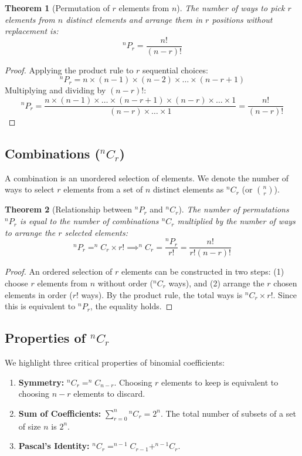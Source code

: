 \documentclass[10pt,journal,compsoc,onecolumn]{IEEEtran}
\newtheorem{theorem}{Theorem}
\begin{document}
\begin{theorem}[Permutation of $r$ elements from $n$]
The number of ways to pick $r$ elements from $n$ distinct elements and arrange them in $r$ positions without replacement is:
\[
^nP_r = \frac{n!}{(n-r)!}
\]
\end{theorem}
\begin{proof}
Applying the product rule to $r$ sequential choices:
\[
^nP_r = n \times (n-1) \times (n-2) \times \dots \times (n-r+1)
\]
Multiplying and dividing by $(n-r)!$:
\[
^nP_r = \frac{n \times (n-1) \times \dots \times (n-r+1) \times (n-r) \times \dots \times 1}{(n-r) \times \dots \times 1} = \frac{n!}{(n-r)!}
\]
\end{proof}

\subsection{Combinations ($^nC_r$)}
A combination is an unordered selection of elements. We denote the number of ways to select $r$ elements from a set of $n$ distinct elements as $^nC_r$ (or $\binom{n}{r}$).

\begin{theorem}[Relationship between $^nP_r$ and $^nC_r$]
The number of permutations $^nP_r$ is equal to the number of combinations $^nC_r$ multiplied by the number of ways to arrange the $r$ selected elements:
\[
^nP_r = ^nC_r \times r! \implies ^nC_r = \frac{^nP_r}{r!} = \frac{n!}{r!(n-r)!}
\]
\end{theorem}
\begin{proof}
An ordered selection of $r$ elements can be constructed in two steps: (1) choose $r$ elements from $n$ without order ($^nC_r$ ways), and (2) arrange the $r$ chosen elements in order ($r!$ ways). By the product rule, the total ways is $^nC_r \times r!$. Since this is equivalent to $^nP_r$, the equality holds.
\end{proof}

\subsection{Properties of $^nC_r$}
We highlight three critical properties of binomial coefficients:
\begin{enumerate}
    \item \textbf{Symmetry:} $^nC_r = ^nC_{n-r}$. Choosing $r$ elements to keep is equivalent to choosing $n-r$ elements to discard.
    \item \textbf{Sum of Coefficients:} $\sum_{r=0}^n {^nC_r} = 2^n$. The total number of subsets of a set of size $n$ is $2^n$.
    \item \textbf{Pascal's Identity:} $^nC_r = ^{n-1}C_{r-1} + ^{n-1}C_r$.
\end{enumerate}
\end{document}
